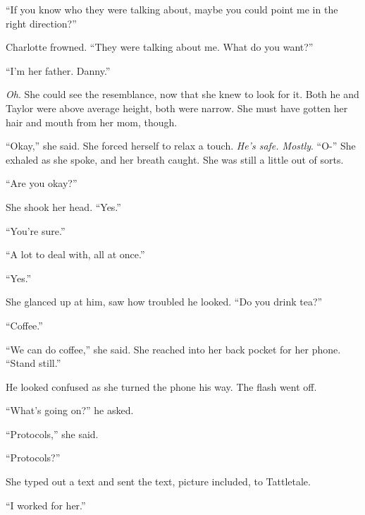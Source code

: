 ``If you know who they were talking about, maybe you could point me in the right direction?''



Charlotte frowned.  ``They were talking about me.  What do you want?''



``I'm her father.  Danny.''



\emph{Oh}.  She could see the resemblance, now that she knew to look for it.  Both he and Taylor were above average height, both were narrow.  She must have gotten her hair and mouth from her mom, though.



``Okay,'' she said.  She forced herself to relax a touch.  \emph{He's safe.  Mostly}.  ``O-''  She exhaled as she spoke, and her breath caught.  She was still a little out of sorts.



``Are you okay?''



She shook her head.  ``Yes.''



``You're sure.''



``A lot to deal with, all at once.''



``Yes.''



She glanced up at him, saw how troubled he looked.  ``Do you drink tea?''



``Coffee.''



``We can do coffee,'' she said.  She reached into her back pocket for her phone.  ``Stand still.''



He looked confused as she turned the phone his way.  The flash went off.



``What's going on?'' he asked.



``Protocols,'' she said.



``Protocols?''



She typed out a text and sent the text, picture included, to Tattletale.



``I worked for her.''



